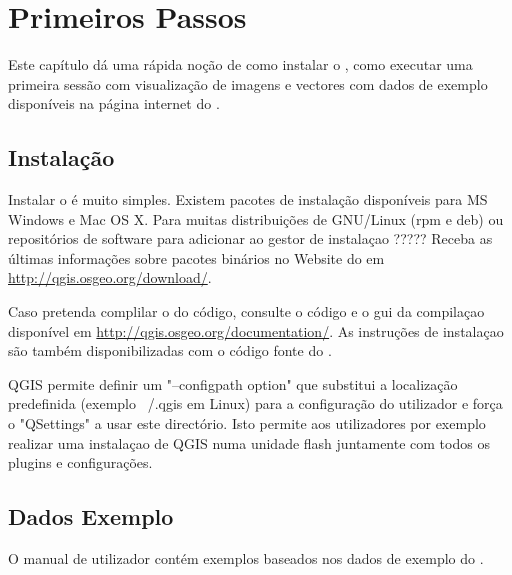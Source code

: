 
\chapter{Primeiros Passos}\label{label_getstarted}


Este capítulo dá uma rápida noção de como instalar o \qg, como executar uma primeira sessão
com visualização de imagens e vectores com dados 
de exemplo disponíveis na página internet do \qg.


\section{Instalação}\label{label_installation}

Instalar o \qg é muito simples. Existem pacotes de instalação 
disponíveis para MS Windows e Mac OS X. Para muitas distribuições de GNU/Linux 
(rpm e deb) ou repositórios de software para adicionar ao gestor de instalaçao ?????
Receba as últimas informações sobre pacotes binários no 
Website do \qg em \url{http://qgis.osgeo.org/download/}.


Caso pretenda complilar o \qg do código, consulte o código e o 
gui da compilaçao disponível em \url{http://qgis.osgeo.org/documentation/}. 
As instruções de instalaçao são também disponibilizadas com o código fonte do \qg.


QGIS permite definir um "--configpath option" que substitui a localização predefinida 
(exemplo ~/.qgis em Linux) para a configuração do utilizador e força o "QSettings" a usar 
este directório. Isto permite aos utilizadores por exemplo realizar uma instalaçao de QGIS numa 
unidade flash juntamente com todos os plugins e configurações. 

\section{Dados Exemplo}\label{label_sampledata}

O manual de utilizador contém exemplos baseados nos dados de exemplo do \qg. 

